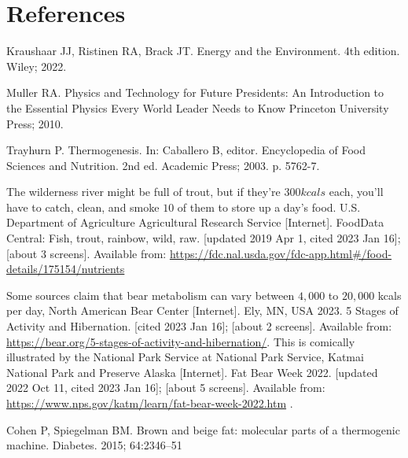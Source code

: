 \documentclass[12pt]{iopart}
\begin{document}
\section*{References}
\begin{thebibliography}{99}

Kraushaar JJ, Ristinen RA, Brack JT.
Energy and the Environment. 4th edition.
Wiley; 2022.

Muller RA.
Physics and Technology for Future Presidents: An Introduction to the Essential Physics Every World Leader Needs to Know
Princeton University Press; 2010.

Trayhurn P.
Thermogenesis.
In: Caballero B, editor.
Encyclopedia of Food Sciences and Nutrition. 2nd ed.
Academic Press;
2003.
p. 5762-7.

The wilderness river might be full of trout, but if they're $300kcals$ each, you'll have to catch, clean, and smoke $10$ of them to store up a day's food.
U.S. Department of Agriculture Agricultural Research Service [Internet].
FoodData Central: Fish, trout, rainbow, wild, raw.
[updated 2019 Apr 1, cited 2023 Jan 16]; [about 3 screens].
Available from: \url{https://fdc.nal.usda.gov/fdc-app.html#/food-details/175154/nutrients}

Some sources claim that bear metabolism can vary between $4,000$ to $20,000$ kcals per day, 
North American Bear Center [Internet]. 
Ely, MN, USA 2023. 
5 Stages of Activity and Hibernation.
[cited 2023 Jan 16]; [about 2 screens].
Available from: \url{https://bear.org/5-stages-of-activity-and-hibernation/}.
%
This is comically illustrated by the National Park Service at 
National Park Service, Katmai National Park and Preserve Alaska [Internet].
Fat Bear Week 2022.
[updated 2022 Oct 11, cited 2023 Jan 16]; [about 5 screens].
Available from: \url{https://www.nps.gov/katm/learn/fat-bear-week-2022.htm} .


Cohen P, Spiegelman BM.
Brown and beige fat: molecular parts of a thermogenic machine.
Diabetes.
2015;
64:2346–51


\end{thebibliography}
\end{document}
